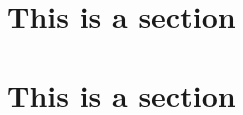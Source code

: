 \documentclass[a4paper]{article}
\begin{document}
\section{This is a section}

\section{This is a section}
\end{document}
